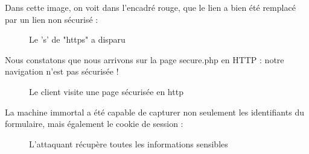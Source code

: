 Dans cette image, on voit dans l'encadré rouge, que le lien  a bien été remplacé par un lien non sécurisé  :

\begin{figure}[H]
  \caption{Le 's' de "https" a disparu}
\end{figure}

Nous constatons que nous arrivons sur la page secure.php en HTTP : notre navigation n'est pas sécurisée !

\begin{figure}[H]
  \caption{Le client visite une page sécurisée en http}
\end{figure}

La machine immortal a été capable de capturer non seulement les identifiants du formulaire, mais également le cookie de session :

\begin{figure}[H]
  \caption{L'attaquant récupère toutes les informations sensibles}
\end{figure}

